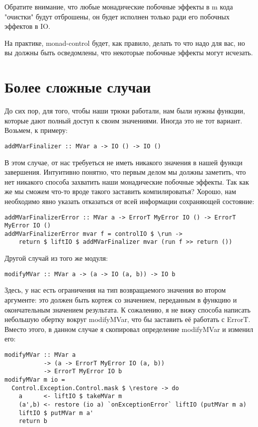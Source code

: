 Обратите внимание, что любые монадические побочные эффекты в m кода "очистки"
будут отброшены, он будет исполнен только ради его побочных эффектов в IO.

На практике, monad-control будет, как правило, делать то что надо для вас, но
вы должны быть осведомлены, что некоторые побочные эффекты могут исчезать.

\section{Более сложные случаи}
До сих пор, для того, чтобы наши трюки работали, нам были нужны функции,
которые дают полный доступ к своим значениями. Иногда это не тот вариант.
Возьмем, к примеру:

\begin{lstlisting}
addMVarFinalizer :: MVar a -> IO () -> IO ()
\end{lstlisting}

В этом случае, от нас требуеться не иметь никакого значения в нашей функци
завершения. Интуитивно понятно, что первым делом мы должны заметить, что нет
никакого способа захватить наши монадические побочные эффекты. Так как же мы
сможем что-то вроде такого заставить компилироватья? Хорошо, нам необходимо
явно указать отказаться от всей информации сохраняющей состояние:

\begin{lstlisting}
addMVarFinalizerError :: MVar a -> ErrorT MyError IO () -> ErrorT MyError IO ()
addMVarFinalizerError mvar f = controlIO $ \run ->
    return $ liftIO $ addMVarFinalizer mvar (run f >> return ())
\end{lstlisting}

Другой случай из того же модуля:

\begin{lstlisting}
modifyMVar :: MVar a -> (a -> IO (a, b)) -> IO b
\end{lstlisting}

Здесь, у нас есть ограничения на тип возвращаемого значения во втором
аргументе: это должен быть кортеж со значением, переданным в функцию и
окончательным значением результата. К сожалению, я не вижу способа написать
небольшую обертку вокруг modifyMVar, что бы заставить её работать с ErrorT.
Вместо этого, в данном случае я скопировал определение modifyMVar и изменил
его:

\begin{lstlisting}
modifyMVar :: MVar a
           -> (a -> ErrorT MyError IO (a, b))
           -> ErrorT MyError IO b
modifyMVar m io =
  Control.Exception.Control.mask $ \restore -> do
    a      <- liftIO $ takeMVar m
    (a',b) <- restore (io a) `onExceptionError` liftIO (putMVar m a)
    liftIO $ putMVar m a'
    return b
\end{lstlisting}
